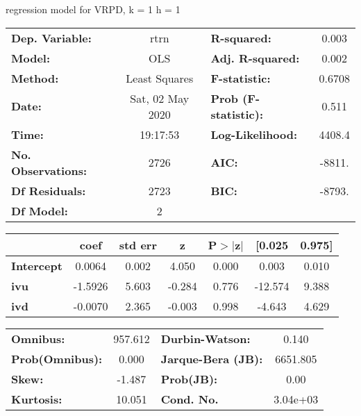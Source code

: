 regression model for VRPD, k = 1 h = 1\begin{center}
\begin{tabular}{lclc}
\toprule
\textbf{Dep. Variable:}    &       rtrn       & \textbf{  R-squared:         } &     0.003   \\
\textbf{Model:}            &       OLS        & \textbf{  Adj. R-squared:    } &     0.002   \\
\textbf{Method:}           &  Least Squares   & \textbf{  F-statistic:       } &    0.6708   \\
\textbf{Date:}             & Sat, 02 May 2020 & \textbf{  Prob (F-statistic):} &    0.511    \\
\textbf{Time:}             &     19:17:53     & \textbf{  Log-Likelihood:    } &    4408.4   \\
\textbf{No. Observations:} &        2726      & \textbf{  AIC:               } &    -8811.   \\
\textbf{Df Residuals:}     &        2723      & \textbf{  BIC:               } &    -8793.   \\
\textbf{Df Model:}         &           2      & \textbf{                     } &             \\
\bottomrule
\end{tabular}
\begin{tabular}{lcccccc}
                   & \textbf{coef} & \textbf{std err} & \textbf{z} & \textbf{P$> |$z$|$} & \textbf{[0.025} & \textbf{0.975]}  \\
\midrule
\textbf{Intercept} &       0.0064  &        0.002     &     4.050  &         0.000        &        0.003    &        0.010     \\
\textbf{ivu}       &      -1.5926  &        5.603     &    -0.284  &         0.776        &      -12.574    &        9.388     \\
\textbf{ivd}       &      -0.0070  &        2.365     &    -0.003  &         0.998        &       -4.643    &        4.629     \\
\bottomrule
\end{tabular}
\begin{tabular}{lclc}
\textbf{Omnibus:}       & 957.612 & \textbf{  Durbin-Watson:     } &    0.140  \\
\textbf{Prob(Omnibus):} &   0.000 & \textbf{  Jarque-Bera (JB):  } & 6651.805  \\
\textbf{Skew:}          &  -1.487 & \textbf{  Prob(JB):          } &     0.00  \\
\textbf{Kurtosis:}      &  10.051 & \textbf{  Cond. No.          } & 3.04e+03  \\
\bottomrule
\end{tabular}
\end{center}

